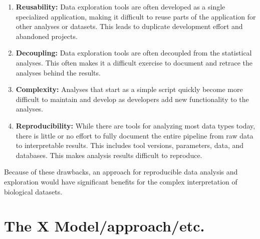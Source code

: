 \begin{enumerate}
    \item \textbf{Reusability:} Data exploration tools are often
        developed as a single specialized application, making it difficult to
        reuse parts of the application for other analyses or datasets. This
        leads to duplicate development effort and abandoned projects. 
    \item \textbf{Decoupling:} Data exploration tools are often decoupled from
        the statistical analyses. This often makes it a difficult 
        exercise to
        document and retrace the analyses behind the results. 
    \item \textbf{Complexity:} 
        Analyses that start as a simple script quickly become more 
        difficult to
        maintain and develop as developers add new functionality to the
        analyses. %
    \item \textbf{Reproducibility:} While there are tools for analyzing most
        data types today, there is little or no effort to fully document the
        entire 
        pipeline from raw data to interpretable results. This includes
        tool versions, parameters, data, and databases. This makes analysis
        results difficult to reproduce. 
\end{enumerate} 

Because of these drawbacks, an approach for reproducible data analysis and
exploration would have significant benefits for the 
complex interpretation
of biological datasets.

\section{The X Model/approach/etc.} 


